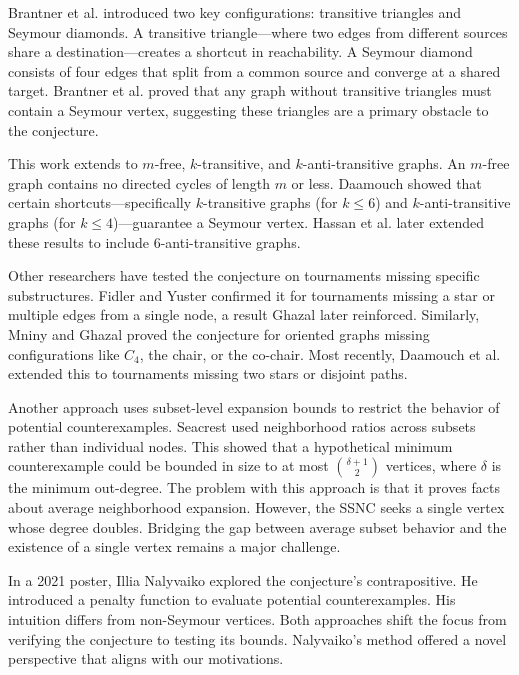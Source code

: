 \documentclass[AMS, Times1COL]{article} %
\theoremstyle{definition}
\begin{document}
	Brantner et al. \cite{BBKS} introduced two key configurations: transitive triangles and Seymour diamonds. A transitive triangle—where two edges from different sources share a destination—creates a shortcut in reachability. A Seymour diamond consists of four edges that split from a common source and converge at a shared target. Brantner et al. proved that any graph without transitive triangles must contain a Seymour vertex, suggesting these triangles are a primary obstacle to the conjecture.
	
	This work extends to $m$-free, $k$-transitive, and $k$-anti-transitive graphs. An $m$-free graph contains no directed cycles of length $m$ or less. Daamouch \cite{Da} showed that certain shortcuts—specifically $k$-transitive graphs (for $k \leq 6$) and $k$-anti-transitive graphs (for $k \leq 4$)—guarantee a Seymour vertex. Hassan et al. \cite{HKPS} later extended these results to include 6-anti-transitive graphs.
	
	Other researchers have tested the conjecture on tournaments missing specific substructures. Fidler and Yuster \cite{FidlerYuster} confirmed it for tournaments missing a star or multiple edges from a single node, a result Ghazal \cite{Ghazal_2011} later reinforced. Similarly, Mniny and Ghazal \cite{MninyGhazal} proved the conjecture for oriented graphs missing configurations like $C_4$, the chair, or the co-chair. Most recently, Daamouch et al. \cite{daamouch2024secondneighborhoodconjecturetournaments} extended this to tournaments missing two stars or disjoint paths.
	
	Another approach uses subset-level expansion bounds to restrict the behavior of potential counterexamples. Seacrest \cite{Scrt} used neighborhood ratios across subsets rather than individual nodes. This showed that a hypothetical minimum counterexample could be bounded in size to at most $\binom{\delta +1}{2}$ vertices, where $\delta$ is the minimum out-degree. The problem with this approach is that it proves facts about average neighborhood expansion. However, the SSNC seeks a single vertex whose degree doubles. Bridging the gap between average subset behavior and the existence of a single vertex remains a major challenge.
	
	In a 2021 poster, Illia Nalyvaiko \cite{NALYVAIKO2021poster} explored the conjecture's contrapositive. He introduced a penalty function to evaluate potential counterexamples. His intuition differs from non-Seymour vertices. Both approaches shift the focus from verifying the conjecture to testing its bounds. Nalyvaiko's method offered a novel perspective that aligns with our motivations.
	
\end{document}
